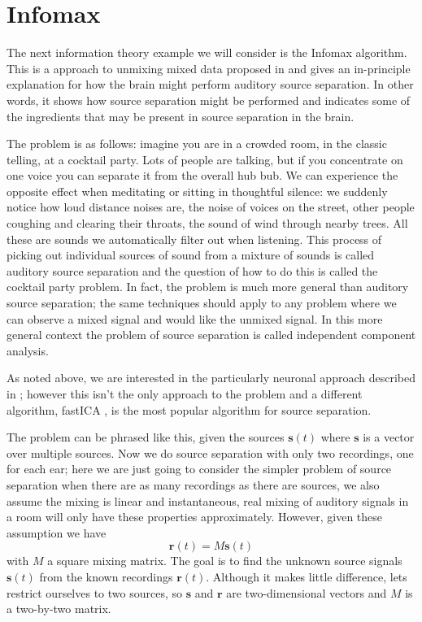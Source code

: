 \documentclass[12pt]{article}
\begin{document}
\section*{Infomax}

The next information theory example we will consider is the Infomax
algorithm. This is a approach to unmixing mixed data proposed in
\cite{BellSejnowski1995} and gives an in-principle explanation for how
the brain might perform auditory source separation. In other words, it
shows how source separation might be performed and indicates some of
the ingredients that may be present in source separation in the brain.

The problem is as follows: imagine you are in a crowded room, in the
classic telling, at a cocktail party. Lots of people are talking, but
if you concentrate on one voice you can separate it from the overall
hub bub. We can experience the opposite effect when meditating or
sitting in thoughtful silence: we suddenly notice how loud distance
noises are, the noise of voices on the street, other people coughing
and clearing their throats, the sound of wind through nearby
trees. All these are sounds we automatically filter out when
listening. This process of picking out individual sources of sound
from a mixture of sounds is called auditory source separation and the
question of how to do this is called the cocktail party problem. In
fact, the problem is much more general than auditory source
separation; the same techniques should apply to any problem where we
can observe a mixed signal and would like the unmixed signal. In this
more general context the problem of source separation is called
independent component analysis.

As noted above, we are interested in the particularly neuronal
approach described in \cite{BellSejnowski1995}; however this isn't the
only approach to the problem and a different algorithm, fastICA
\citep{Hyvarinen1999}, is the most popular algorithm for source separation.

The problem can be phrased like this, given the sources
$\textbf{s}(t)$ where $\textbf{s}$ is a vector over multiple
sources. Now we do source separation with only two recordings, one for
each ear; here we are just going to consider the simpler problem of
source separation when there are as many recordings as there are
sources, we also assume the mixing is linear and instantaneous, real
mixing of auditory signals in a room will only have these properties
approximately. However, given these assumption we have
\begin{equation} \mathbf{r}(t)=M\mathbf{s}(t) \end{equation} with $M$
a square mixing matrix. The goal is to find the unknown source signals
$\textbf{s}(t)$ from the known recordings $\textbf{r}(t)$. Although it
makes little difference, lets restrict ourselves to two sources, so
$\mathbf{s}$ and $\mathbf{r}$ are two-dimensional vectors and $M$ is a
two-by-two matrix.
\end{document}
